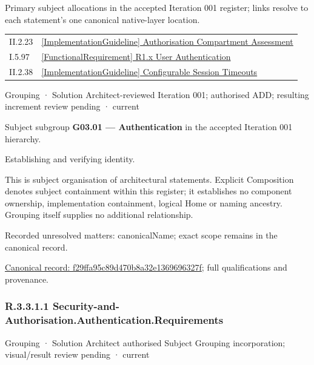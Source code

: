 Primary subject allocations in the accepted Iteration 001 register; links resolve to each statement’s one canonical native-layer location.\par
\begin{longtable}{p{.22\linewidth}p{.73\linewidth}}
II.2.23 & \hyperref[element:a471a150c7d24210a991e96ed82e27a2]{[ImplementationGuideline] Authorisation Compartment Assessment} \\
I.5.97 & \hyperref[element:9683182663cd40428d806ed2d8685511]{[FunctionalRequirement] R1.x User Authentication} \\
II.2.38 & \hyperref[element:886896239b2e40b0b3bda53e922a2ab6]{[ImplementationGuideline] Configurable Session Timeouts} \\
\end{longtable}
\label{element:f29ffa95c89d470b8a32e1369696327f}
{\small Grouping · Solution Architect-reviewed Iteration 001; authorised ADD; resulting increment review pending · current}\par

Subject subgroup \textbf{G03.01 — Authentication} in the accepted Iteration 001 hierarchy.



Establishing and verifying identity.



This is subject organisation of architectural statements. Explicit Composition denotes subject containment within this register; it establishes no component ownership, implementation containment, logical Home or naming ancestry. Grouping itself supplies no additional relationship.


{\small Recorded unresolved matters: canonicalName; exact scope remains in the canonical record.}\par
{\footnotesize \href{../../../../continuum/grouping/f29ffa95c89d470b8a32e1369696327f.md}{Canonical record: f29ffa95c89d470b8a32e1369696327f}; full qualifications and provenance.}\par
\subsubsection*{R.3.3.1.1 Security-and-Authorisation.Authentication.Requirements}
\label{navigation:R.3.3.1.1}

\label{element:395d77eea25d40b0b74321dc7aabd283}
{\small Grouping · Solution Architect authorised Subject Grouping incorporation; visual/result review pending · current}\par

